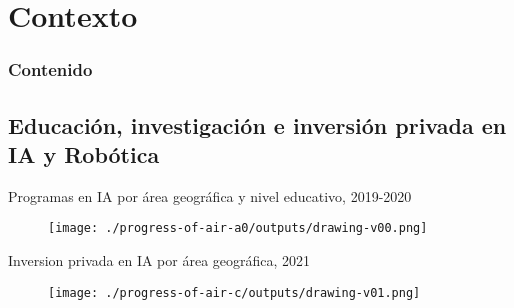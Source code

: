 \section{Contexto}


\begin{frame}
      \frametitle{Contenido}
      \tableofcontents[currentsection]
\end{frame}

\subsection{Educaci\'on, investigaci\'on e inversi\'on privada en IA y Rob\'otica}

{

\begin{frame}{
Programas en IA por \'area geogr\'afica y nivel educativo, 2019-2020
}

\begin{figure}
 \centering
 \texttt{[image: ./progress-of-air-a0/outputs/drawing-v00.png]}
\end{figure}

\end{frame}
}

{

\begin{frame}{
Inversion privada en IA por \'area geogr\'afica, 2021
}

\begin{figure}
 \centering
 \texttt{[image: ./progress-of-air-c/outputs/drawing-v01.png]}
\end{figure}

\end{frame}
}



